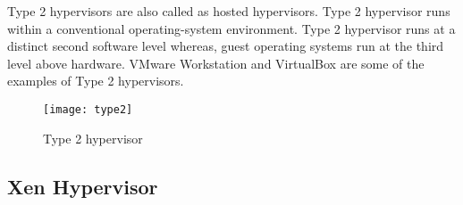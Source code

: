 \begin{description}
\item Type 2 hypervisors are also called as hosted hypervisors. Type 2 hypervisor runs within a conventional operating-system environment. Type 2 hypervisor runs at a distinct second software level whereas, guest operating systems run at the third level above hardware. VMware Workstation and VirtualBox are some of the examples of Type 2 hypervisors\cite{Sugerman:2001:VID:647055.715774, citeulike:3149886}.
\end{description}
\begin{figure}[!ht]
\centering
\texttt{[image: type2]}
\caption{Type 2 hypervisor}
\label{fig:Type 2 hypervisor}
\end{figure}

\subsection{Xen Hypervisor}

